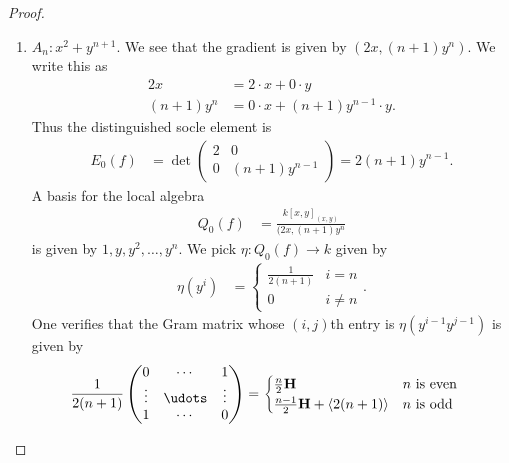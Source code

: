 \documentclass[english]{article}
\begin{document}
\begin{proof}
\begin{enumerate}
    \item $A_n : x^2 + y^{n+1}$. We see that the gradient is given by $(2x,(n+1)y^n)$. We write this as
    \begin{align*}
        2x &= 2\cdot x + 0\cdot y \\
        (n+1)y^n &= 0\cdot x + (n+1)y^{n-1}\cdot y.
    \end{align*}
    Thus the distinguished socle element is
    \begin{align*}
        E_0(f) &= \det \begin{pmatrix} 2 & 0 \\ 0 & (n+1)y^{n-1} \end{pmatrix} = 2(n+1)y^{n-1}.
    \end{align*}
    A basis for the local algebra
    \begin{align*}
        Q_0(f) &= \frac{k[x,y]_{(x,y)}}{(2x, (n+1)y^n}
    \end{align*}
    is given by $1,y,y^2, \ldots, y^n$. We pick $\eta: Q_0(f) \to k$ given by
    \begin{align*}
        \eta(y^i) &= \begin{cases} \frac{1}{2(n+1)} & i=n \\ 0 & i\ne n \end{cases}.
    \end{align*}
    One verifies that the Gram matrix whose $(i,j)$th entry is $\eta(y^{i-1} y^{j-1})$ is given by
    \begin{align*}
        \frac{1}{2(n+1)}  \begin{pmatrix} 0 & \cdots & 1 \\ \vdots & \udots & \vdots \\ 1 & \cdots & 0 \end{pmatrix} &= \begin{cases} \frac{n}{2}\H & n\text{ is even} \\ \frac{n-1}{2}\H + \left\langle 2(n+1) \right\rangle & n\text{ is odd} \end{cases}
    \end{align*}
    

\end{enumerate}
\end{proof}
\end{document}
